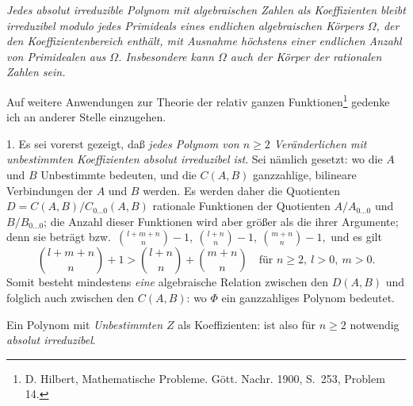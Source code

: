 \emph{Jedes absolut irreduzible Polynom mit algebraischen Zahlen als Koeffizienten bleibt irreduzibel modulo jedes Primideals eines endlichen algebraischen Körpers $\Omega$, der den Koeffizientenbereich enthält, mit Ausnahme höchstens einer endlichen Anzahl von Primidealen aus $\Omega$. Insbesondere kann $\Omega$ auch der Körper der rationalen Zahlen sein.}

Auf weitere Anwendungen zur Theorie der relativ ganzen Funktionen\footnote{D. Hilbert, Mathematische Probleme. Gött. Nachr. 1900, S.~253, Problem 14.} gedenke ich an anderer Stelle einzugehen.

1. Es sei vorerst gezeigt, daß \emph{jedes Polynom von $n\ge2$ Veränderlichen mit unbestimmten Koeffizienten absolut irreduzibel ist}. Sei nämlich gesetzt:
wo die $A$ und $B$ Unbestimmte bedeuten, und die $C(A,B)$ ganzzahlige, bilineare Verbindungen der $A$ und $B$ werden. Es werden daher die Quotienten $D=C(A,B)/C_{0\ldots0}(A,B)$
rationale Funktionen der Quotienten $A/A_{0\ldots0}$ und $B/B_{0\ldots0}$; die Anzahl dieser Funktionen wird aber größer als die ihrer Argumente; denn sie beträgt bzw.\ $\binom{l+m+n}{n}-1,\ \binom{l+n}{n}-1,\ \binom{m+n}{n}-1,$ und es gilt
\[
\binom{l+m+n}{n}+1>
\binom{l+n}{n}+\binom{m+n}{n}
\quad\text{für } n\ge2,\ l>0,\ m>0.
\]
Somit besteht mindestens \emph{eine} algebraische Relation zwischen den $D(A,B)$ und folglich auch zwischen den $C(A,B)$:
wo $\Phi$ ein ganzzahliges Polynom bedeutet.

Ein Polynom mit \emph{Unbestimmten $Z$} als Koeffizienten:
ist also für $n\ge2$ notwendig \emph{absolut irreduzibel}.\addtocounter{footnote}{1}

